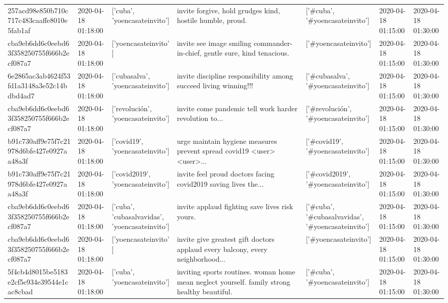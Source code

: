 \begin{tabular}{lllllll}
257acd98e850b710c717c483caaffe8010e5fab1af & 2020-04-18 01:18:00 & ['cuba', 'yoencasateinvito'] & invite forgive, hold grudges kind, hostile humble, proud. & ['#cuba', '#yoencasateinvito'] & 2020-04-18 01:15:00 & 2020-04-18 01:30:00 \\
cba9eb6dd6c0eebd63f358250755f666b2ecf087a7 & 2020-04-18 01:18:00 & ['yoencasateinvito'] & invite see image smiling commander-in-chief, gentle sure, kind tenacious. & ['#yoencasateinvito'] & 2020-04-18 01:15:00 & 2020-04-18 01:30:00 \\
6e2865ac3ab4624f53fd1a3148a3e52c14bdbd4ad7 & 2020-04-18 01:18:00 & ['cubasalva', 'yoencasateinvito'] & invite discipline responsibility among succeed living winning!!! & ['#cubasalva', '#yoencasateinvito'] & 2020-04-18 01:15:00 & 2020-04-18 01:30:00 \\
cba9eb6dd6c0eebd63f358250755f666b2ecf087a7 & 2020-04-18 01:18:00 & ['revolución', 'yoencasateinvito'] & invite come pandemic tell work harder revolution to... & ['#revolución', '#yoencasateinvito'] & 2020-04-18 01:15:00 & 2020-04-18 01:30:00 \\
b91c730aff9e75f7c21978d6bfe427e0927aa48a3f & 2020-04-18 01:18:00 & ['covid19', 'yoencasateinvito'] & urge maintain hygiene measures prevent spread covid19 <user> <user>... & ['#covid19', '#yoencasateinvito'] & 2020-04-18 01:15:00 & 2020-04-18 01:30:00 \\
b91c730aff9e75f7c21978d6bfe427e0927aa48a3f & 2020-04-18 01:18:00 & ['covid2019', 'yoencasateinvito'] & invite feel proud doctors facing covid2019 saving lives the... & ['#covid2019', '#yoencasateinvito'] & 2020-04-18 01:15:00 & 2020-04-18 01:30:00 \\
cba9eb6dd6c0eebd63f358250755f666b2ecf087a7 & 2020-04-18 01:18:00 & ['cuba', 'cubasalvavidas', 'yoencasateinvito'] & invite applaud fighting save lives risk yours. & ['#cuba', '#cubasalvavidas', '#yoencasateinvito'] & 2020-04-18 01:15:00 & 2020-04-18 01:30:00 \\
cba9eb6dd6c0eebd63f358250755f666b2ecf087a7 & 2020-04-18 01:18:00 & ['yoencasateinvito'] & invite give greatest gift doctors applaud every balcony, every neighborhood... & ['#yoencasateinvito'] & 2020-04-18 01:15:00 & 2020-04-18 01:30:00 \\
5f4cb4d8015be5183e2cf5e934e39544e1cac8cbad & 2020-04-18 01:18:00 & ['cuba', 'yoencasateinvito'] & inviting sports routines. woman home mean neglect yourself. family strong healthy beautiful. & ['#cuba', '#yoencasateinvito'] & 2020-04-18 01:15:00 & 2020-04-18 01:30:00 \\

\end{tabular}
